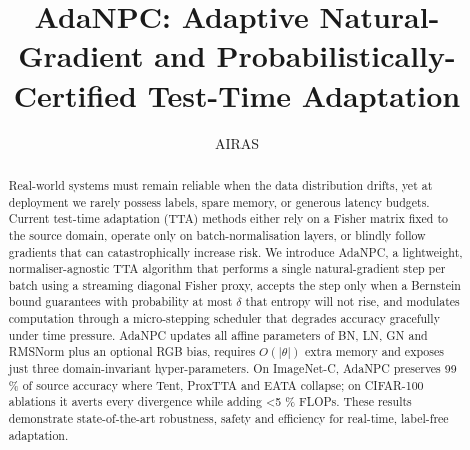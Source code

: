 \documentclass{article} %
\title{AdaNPC\@: Adaptive Natural-Gradient and Probabilistically-Certified Test-Time Adaptation}
\author{AIRAS}
\begin{document}
\maketitle

\begin{abstract}
Real-world systems must remain reliable when the data distribution drifts, yet at deployment we rarely possess labels, spare memory, or generous latency budgets. Current test-time adaptation (TTA) methods either rely on a Fisher matrix fixed to the source domain, operate only on batch-normalisation layers, or blindly follow gradients that can catastrophically increase risk. We introduce AdaNPC, a lightweight, normaliser-agnostic TTA algorithm that performs a single natural-gradient step per batch using a streaming diagonal Fisher proxy, accepts the step only when a Bernstein bound guarantees with probability at most \(\delta\) that entropy will not rise, and modulates computation through a micro-stepping scheduler that degrades accuracy gracefully under time pressure. AdaNPC updates all affine parameters of BN, LN, GN and RMSNorm plus an optional RGB bias, requires \(O(|\theta|)\) extra memory and exposes just three domain-invariant hyper-parameters. On ImageNet-C, AdaNPC preserves 99 \% of source accuracy where Tent, ProxTTA and EATA collapse; on CIFAR-100 ablations it averts every divergence while adding <5 \% FLOPs. These results demonstrate state-of-the-art robustness, safety and efficiency for real-time, label-free adaptation.
\end{abstract}
\end{document}

